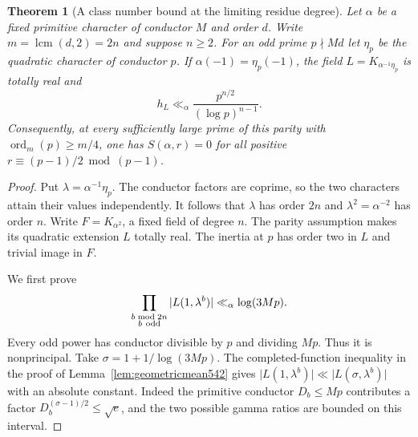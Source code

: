 \documentclass[a4paper,11pt]{article}
\newtheorem{theorem}[proposition]{Theorem}
\theoremstyle{definition}
\theoremstyle{remark}
\numberwithin{equation}{section}
\begin{document}
\begin{theorem}[A class number bound at the limiting residue degree]
\leavevmode\label{thm:fixedboundary543}
Let \(\alpha\) be a fixed primitive character of conductor \(M\)
and order \(d\). Write \(m=\operatorname{lcm}(d,2)=2n\) and
suppose \(n\ge2\). For an odd prime \(p\nmid Md\) let
\(\eta_p\) be the quadratic character of conductor \(p\).
If \(\alpha(-1)=\eta_p(-1)\), the field
\(L=K_{\alpha^{-1}\eta_p}\) is totally real and
\[
                    h_L\ll_{\alpha}
                    \frac{p^{n/2}}{(\log p)^{n-1}} .
\]
Consequently, at every sufficiently large prime of this parity
with \(\operatorname{ord}_m(p)\ge m/4\), one has
\(S(\alpha,r)=0\) for all positive
\(r\equiv(p-1)/2\bmod(p-1)\).
\end{theorem}
\begin{proof}
Put \(\lambda=\alpha^{-1}\eta_p\). The conductor factors are
coprime, so the two characters attain their values independently.
It follows that \(\lambda\) has order \(2n\) and
\(\lambda^2=\alpha^{-2}\) has order \(n\).
Write \(F=K_{\alpha^2}\), a fixed field of degree \(n\).
The parity assumption makes its quadratic extension \(L\) totally
real. The inertia at \(p\) has order two in \(L\) and trivial
image in \(F\).

We first prove
\begin{equation}
          \prod_{\substack{b\bmod 2n\\b\ {\rm odd}}}
                 |L(1,\lambda^b)|\ll_{\alpha}\log(3Mp).
          \label{eq:fixedLproduct543}
\end{equation}
Every odd power has conductor divisible by \(p\) and dividing
\(Mp\). Thus it is nonprincipal. Take
\(\sigma=1+1/\log(3Mp)\). The completed-function inequality
in the proof of Lemma~\ref{lem:geometricmean542} gives
\(\lvert L(1,\lambda^b)\rvert\ll
\lvert L(\sigma,\lambda^b)\rvert\) with an absolute
constant. Indeed the primitive conductor \(D_b\le Mp\)
contributes a factor \(D_b^{(\sigma-1)/2}\le\sqrt e\),
and the two possible gamma ratios are bounded on this interval.


\end{proof}
\end{document}
